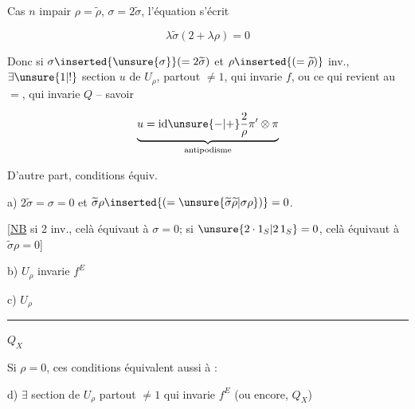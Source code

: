  Cas $n$ impair $\rho=\widetilde\rho$, $\sigma=2\widetilde\sigma$, l'équation s'écrit

\[
\lambda\widetilde\sigma(2+\lambda\rho)=0
\]

Donc si $\sigma\inserted{\unsure{\sigma}}(=2\widetilde\sigma)$ et $\rho\inserted{(=\widetilde\rho)}$ inv.,  $\exists\unsure{1|!}$ section $u$ de $U_\rho$, partout $\ne1$,  qui invarie $f$, ou ce qui revient au $=$, qui invarie $Q$ -- savoir

\[
\underbrace{u=\mathrm{id}\unsure{-|+}\frac{2}{\rho}\pi'\otimes\pi}_{\text{antipodisme}}
\]

D'autre part, conditions équiv.

 a) $2\widetilde\sigma=\sigma=0$ et $\widetilde\sigma\rho\inserted{(=\unsure{\widetilde\sigma\widetilde\rho|\sigma\rho})}=0$.

[\uline{NB} si 2 inv., celà équivaut à $\sigma=0$; si $\unsure{2\cdot1_S|2\,1_S}=0$, celà équivaut à $\widetilde\sigma\rho=0$]

b) $U_\rho$ invarie $f^E$

c) $U_\rho$ \rule{1.6cm}{0.35pt} $Q_X$

Si  $\rho=0$, ces conditions équivalent aussi à :

d) $\exists$  section de $U_\rho$ partout $\ne1$ qui invarie $f^E$ (ou encore, $Q_X$)
